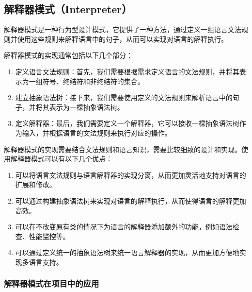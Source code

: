 \subsection{解释器模式（Interpreter）}

解释器模式是一种行为型设计模式，它提供了一种方法，通过定义一组语言文法规则并使用这些规则来解释语言中的句子，从而可以实现对语言的解释执行。

解释器模式的实现通常包括以下几个部分：
\begin{enumerate}
    \item 定义语言文法规则：首先，我们需要根据需求定义语言的文法规则，并将其表示为一组符号、终结符和非终结符的集合。
    \item 建立抽象语法树：接下来，我们需要使用定义的文法规则来解析语言中的句子，并将其表示为一棵抽象语法树。
    \item 定义解释器：最后，我们需要定义一个解释器，它可以接收一棵抽象语法树作为输入，并根据语言的文法规则来执行对应的操作。
\end{enumerate}

解释器模式的实现需要结合文法规则和语言知识，需要比较细致的设计和实现。使用解释器模式可以有以下几个优点：

\begin{enumerate}
    \item 可以将语言文法规则与语言解释器的实现分离，从而更加灵活地支持对语言的扩展和修改。
    \item 可以通过构建抽象语法树来实现对语言的解释执行，从而使得语言的解释更加高效。
    \item 可以在不改变原有类的情况下为语言的解释器添加额外的功能，例如语法检查、性能监控等。
    \item 可以通过定义统一的抽象语法树来统一语言解释器的实现，从而更加方便地实现多语言支持。
\end{enumerate}

\subsubsection{解释器模式在项目中的应用}

